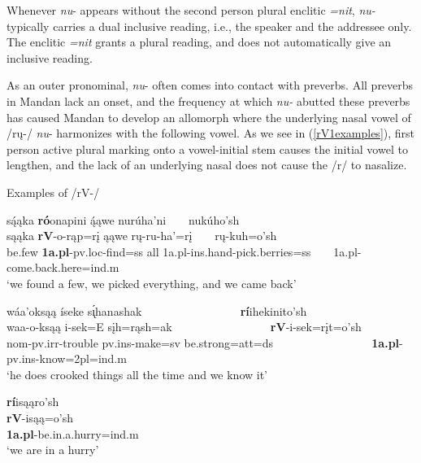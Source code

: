 Whenever \textit{nu}- appears without the second person plural enclitic \textit{=nit}, \textit{nu-} typically carries a dual inclusive reading, i.e., the speaker and the addressee only. The enclitic \textit{=nit} grants a plural reading, and does not automatically give an inclusive reading.

\label{rVallomorph}

As an outer pronominal, \textit{nu}- often comes into contact with preverbs. All preverbs in Mandan lack an onset, and the frequency at which \textit{nu-} abutted these preverbs has caused Mandan to develop an allomorph where the underlying nasal vowel of /rų-/ \textit{nu}- harmonizes with the following vowel. As we see in (\ref{rV1examples}), first person active plural marking onto a vowel-initial stem causes the initial vowel to lengthen, and the lack of an underlying nasal does not cause the /r/ to nasalize.

\begin{exe}

\item\label{rV1examples} Examples of /rV-/

	\begin{xlist}
	

	
	\item \glll są́ąka \textbf{ró}onapini ą́ąwe nurúha'ni ~ ~ nukúho'sh\\
	sąąka \textbf{rV}-o-rąp=rį ąąwe rų-ru-ha'=rį ~ ~  rų-kuh=o'sh\\
	\textnormal{be.few} \textbf{1a.pl}-pv.loc-\textnormal{find}=ss \textnormal{all} 1a.pl-ins.hand-\textnormal{pick.berries}=ss ~ ~  1a.pl-\textnormal{come.back.here}=ind.m\\
	\glt `we found a few, we picked everything, and we came back' \citep[52]{hollow1973a}
	
	\item \glll wáa'oksąą íseke s\'{ı̨}hanashak ~ ~ ~ ~ ~ ~ ~ ~ ~ ~ \textbf{rí}ihekinito'sh\\
	waa-o-ksąą i-sek=E sįh=rąsh=ak ~ ~ ~ ~ ~ ~ ~ ~ ~ ~  \textbf{rV}-i-sek=rįt=o'sh\\
	nom-pv.irr-\textnormal{trouble} pv.ins-\textnormal{make}=sv \textnormal{be.strong}=att=ds ~ ~ ~ ~ ~ ~ ~ ~ ~ ~  \textbf{1a.pl}-pv.ins-\textnormal{know}=2pl=ind.m\\
	\glt `he does crooked things all the time and we know it' \citep[43]{hollow1973a}
	
	\item\label{weareinahurry} \glll \textbf{rí}isąąro'sh\\
	\textbf{rV}-isąą=o'sh\\
	\textbf{1a.pl}-\textnormal{be.in.a.hurry}=ind.m\\
	\glt `we are in a hurry' \citep[92]{hollow1970}
	
	\end{xlist}

\end{exe}

